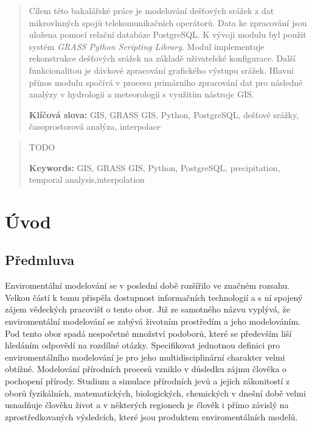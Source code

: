 \documentclass[a4paper,12pt]{report}
\author{Matěj Krejčí}
\newcommand{\klicslova}[2]{\noindent\textbf{#1: }#2}
\newcommand{\necislovana}[1]{%
\phantomsection
\addcontentsline{toc}{section}{#1}
\section*{#1}
\markboth{\uppercase{#1}}{}
}
\begin{document}
\pagestyle{empty}
\renewcommand\footnotelayout{\footnotesize}

\newpage


\begin{abstract}
Cílem této bakalářské práce je modelování dešťových srážek z dat mikrovlnných spojů telekomunikačních operátorů. Data ke zpracování jsou uložena pomocí relační databáze PostgreSQL.
K vývoji modulu byl použit systém \textit{GRASS Python Scripting Library}. Modul implementuje rekonstrukce dešťových srážek na základě uživatelské konfigurace. Další funkcionalitou je dávkové zpracování grafického výstupu srážek. Hlavní přínos modulu spočívá v procesu primárního zpracování dat pro následné analýzy v hydrologii a meteorologii s využitím nástroje GIS.
\bigskip

\klicslova{Klíčová slova}{GIS, GRASS GIS, Python, PostgreSQL, dešťové srážky, časoprostorová analýza, interpolace}

\end{abstract}

\begin{abstract}
TODO 
\bigskip

\klicslova{Keywords}{GIS, GRASS GIS, Python, PostgreSQL, precipitation, temporal analysis,interpolation}

\end{abstract}


\newpage

\newpage

\tableofcontents


\newpage
\necislovana{Úvod}

\pagestyle{fancy}

\setcounter{page}{1}
\subsection*{Předmluva}
Enviromentální modelování se v poslední době rozšířilo ve značném rozsahu. Velkou částí k tomu přispěla dostupnost informačních technologií a s ní spojený zájem vědeckých pracovišť o tento obor. Již ze samotného názvu vyplývá, že enviromentální modelování se zabývá životním prostředím a jeho modelováním. Pod tento obor spadá nespočetné množství podoborů, které se především liší hledáním odpovědí na rozdílné otázky. Specifikovat jednotnou definici pro enviromentálního modelování je pro jeho multidisciplinární charakter velmi obtížné. Modelování přírodních procesů vzniklo v důsledku zájmu člověka o pochopení přírody. Studium a simulace přírodních jevů a jejich zákonitostí z oborů fyzikálních, matematických, biologických, chemických v dnešní době velmi usnadňuje člověku život a v některých regionech je člověk i přímo závislý na zprostředkovaných výsledcích, které jsou produktem enviromentálních modelů. 
\end{document}
